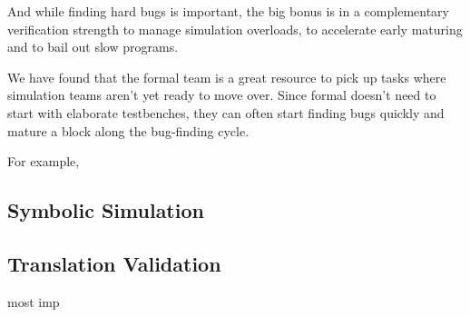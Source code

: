 And while finding hard bugs is important, the big bonus is in a complementary verification strength to manage simulation overloads, to accelerate early maturing and to bail out slow programs.

We have found that the formal team is a great resource to pick up tasks where simulation teams aren’t yet ready to move over. Since formal doesn’t need to start with elaborate testbenches, they can often start finding bugs quickly and mature a block along the bug-finding cycle.

For example, %


\subsection{Symbolic Simulation}


\subsection{Translation Validation}

most imp




